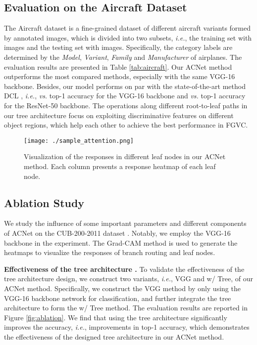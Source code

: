 \documentclass[10pt,twocolumn,letterpaper]{article}
\def\ie{{\em i.e.}}
\begin{document}
\subsection{Evaluation on the Aircraft Dataset}
The Aircraft dataset \cite{maji13fine-grained} is a fine-grained dataset of  different aircraft variants formed by  annotated images, which is divided into two subsets, \ie, the training set with  images and the testing set with  images. Specifically, the category labels are determined by the \textit{Model}, \textit{Variant}, \textit{Family} and \textit{Manufacturer} of airplanes. The evaluation results are presented in Table \ref{tab:aircraft}. 
Our ACNet method outperforms the most compared methods, especially with the same VGG-16 backbone. Besides, our model performs on par with the state-of-the-art method DCL \cite{Chen_2019_CVPR}, \ie,  \textit{vs.}  top-1 accuracy for the VGG-16 backbone and  \textit{vs.}  top-1 accuracy for the ResNet-50 backbone. The operations along different root-to-leaf paths in our tree architecture  focus on exploiting discriminative features on different object regions, which help each other to achieve the best performance in FGVC.

\begin{figure}[t]
\centering
\texttt{[image: ./sample\_attention.png]}
\caption{Visualization of the responses in different leaf nodes in our ACNet method. Each column presents a response heatmap of each leaf node.}
\label{fig:attention}
\vspace{-2mm}
\end{figure}

\subsection{Ablation Study}
We study the influence of some important parameters and different components of ACNet on the CUB-200-2011 dataset \cite{report-wahcub_200_2011}. Notably, we employ the VGG-16 backbone in the experiment. The Grad-CAM method \cite{DBLP:conf/iccv/SelvarajuCDVPB17} is used to generate the heatmaps to visualize the responses of branch routing and leaf nodes.

{\flushleft \textbf{Effectiveness of the tree architecture .}} To validate the effectiveness of the tree architecture design, we construct two variants, \ie, VGG and w/ Tree, of our ACNet method. Specifically, we construct the VGG method by only using the VGG-16 backbone network for classification, and further integrate the tree architecture to form the w/ Tree method. The evaluation results are reported in Figure \ref{fig:ablation}. We find that using the tree architecture significantly improves the accuracy, \ie,  improvements in top-1 accuracy, which demonstrates the effectiveness of the designed tree architecture  in our ACNet method. 
\end{document}
